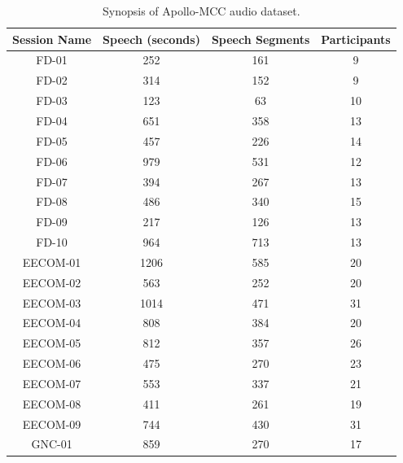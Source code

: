 \documentclass[journal]{IEEEtran}
\begin{document}
\begin{table}[t]
	\centering
	\caption{Synopsis of Apollo-MCC audio dataset.}
	\label{syn}
	\begin{tabular}{|c|c|c|c|}
		\hline
		Session Name & Speech (seconds) & Speech Segments & Participants \\ \hline
		FD-01        & 252              & 161             & 9            \\ \hline
		FD-02        & 314              & 152             & 9            \\ \hline
		FD-03        & 123              & 63              & 10           \\ \hline
		FD-04        & 651              & 358             & 13           \\ \hline
		FD-05        & 457              & 226             & 14           \\ \hline
		FD-06        & 979              & 531             & 12           \\ \hline
		FD-07        & 394              & 267             & 13           \\ \hline
		FD-08        & 486              & 340             & 15           \\ \hline
		FD-09        & 217              & 126             & 13           \\ \hline
		FD-10        & 964              & 713             & 13           \\ \hline
		EECOM-01     & 1206             & 585             & 20           \\ \hline
		EECOM-02     & 563              & 252             & 20           \\ \hline
		EECOM-03     & 1014             & 471             & 31           \\ \hline
		EECOM-04     & 808              & 384             & 20           \\ \hline
		EECOM-05     & 812              & 357             & 26           \\ \hline
		EECOM-06     & 475              & 270             & 23           \\ \hline
		EECOM-07     & 553              & 337             & 21           \\ \hline
		EECOM-08     & 411              & 261             & 19           \\ \hline
		EECOM-09     & 744              & 430             & 31           \\ \hline
		GNC-01       & 859              & 270             & 17           \\ \hline

\end{tabular}
\end{table}
\end{document}
